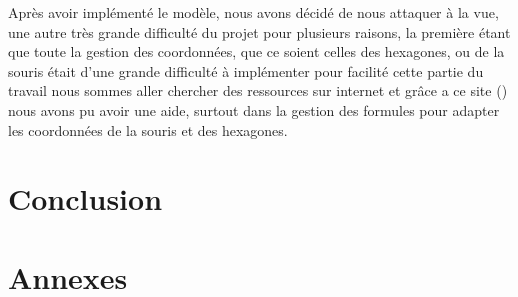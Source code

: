 \documentclass{article}
\begin{document}
    \newline

    Après avoir implémenté le modèle, nous avons décidé de nous attaquer à la vue, une autre très grande difficulté du projet pour plusieurs raisons, la première étant que toute la gestion des coordonnées, que ce soient celles des hexagones, ou de la souris était d'une grande difficulté à implémenter pour facilité cette partie du travail nous sommes aller chercher des ressources sur internet et grâce a ce site () nous avons pu avoir une aide, surtout dans la gestion des formules pour adapter les coordonnées de la souris et des hexagones.


    \section{Conclusion}\label{sec:conclusion}

    \section{Annexes}\label{sec:annexes}



    \tableofcontents
\end{document}
